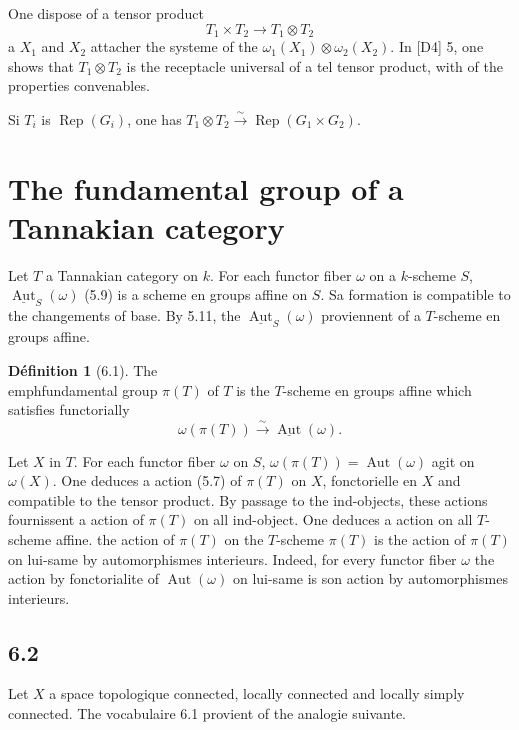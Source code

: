 \documentclass[12pt,a4paper]{article}
\theoremstyle{plain}
\theoremstyle{definition}
\newtheorem{definition}[theorem]{D\'efinition}
\theoremstyle{remark}
\DeclareMathOperator{\Aut}{Aut}
\DeclareMathOperator{\Rep}{Rep}
\begin{document}
One dispose of a tensor product
\[
T_1 
\times T_2 
\longrightarrow T_1 
\otimes T_2
\]
a $X_1$ and $X_2$ attacher the systeme of the $\omega_1(X_1) 
\otimes 
\omega_2(X_2)$. In [D4] 5, one shows that $T_1 
\otimes T_2$ is the receptacle universal of a tel tensor product, with of the properties convenables.

Si $T_i$ is $\Rep(G_i)$, one has $T_1 
\otimes T_2 
\xrightarrow{\sim} 
\Rep(G_1 
\times G_2)$.

\section{The fundamental group of a Tannakian category}
\label{sec:6}

Let $T$ a Tannakian category on $k$. For each functor fiber $\omega$ on a $k$-scheme $S$, $\underline{\Aut}_S(\omega)$ (5.9) is a scheme en groups affine on $S$. Sa formation is compatible to the changements of base. By 5.11, the $\underline{\Aut}_S(\omega)$ proviennent of a $T$-scheme en groups affine.

\begin{definition}[6.1]\label{def:6.1}
The \\emph{fundamental group} $\pi(T)$ of $T$ is the $T$-scheme en groups affine which satisfies functorially
\begin{equation*}\tag{6.1.1}
\omega(\pi(T)) 
\xrightarrow{\sim} 
\underline{\Aut}(\omega).
\end{equation*}
\end{definition}

Let $X$ in $T$. For each functor fiber $\omega$ on $S$, $\omega(\pi(T)) = 
\Aut(\omega)$ agit on $\omega(X)$. One deduces a action (5.7) of $\pi(T)$ on $X$, fonctorielle en $X$ and compatible to the tensor product. By passage to the ind-objects, these actions fournissent a action of $\pi(T)$ on all ind-object. One deduces a action on all $T$-scheme affine. the action of $\pi(T)$ on the $T$-scheme $\pi(T)$ is the action of $\pi(T)$ on lui-same by automorphismes interieurs. Indeed, for every functor fiber $\omega$ the action by fonctorialite of $\Aut(\omega)$ on lui-same is son action by automorphismes interieurs.

\subsection*{6.2}
Let $X$ a space topologique connected, locally connected and locally simply connected. The vocabulaire 6.1 provient of the analogie suivante.
\end{document}
